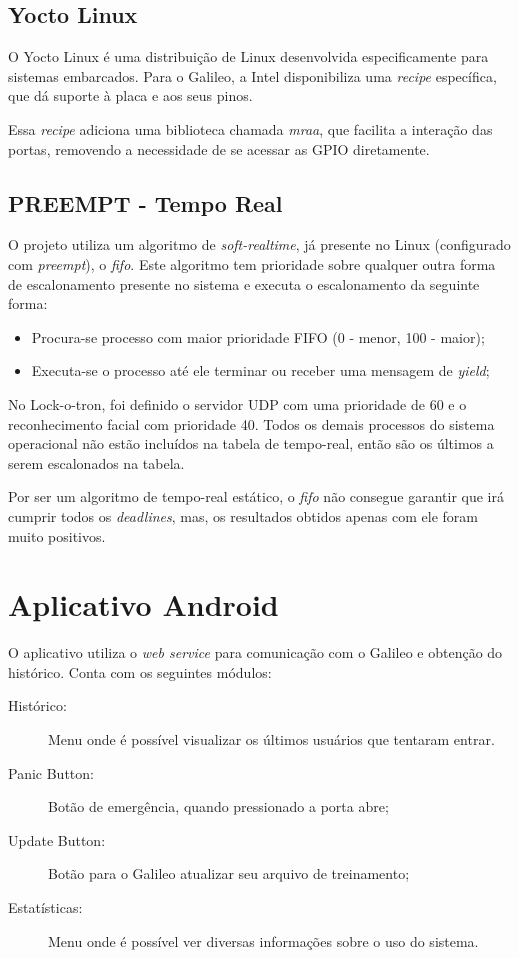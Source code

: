 \documentclass[12pt]{article}
\begin{document}
\subsection{Yocto Linux}
    O Yocto Linux é uma distribuição de Linux desenvolvida especificamente para
    sistemas embarcados. Para o Galileo, a Intel disponibiliza uma
     \textit{recipe} específica, que dá suporte à placa e aos seus pinos.

    Essa \textit{recipe} adiciona uma biblioteca chamada \textit{mraa},
    que facilita a interação das portas, removendo a necessidade de se acessar
    as GPIO diretamente.

\subsection{PREEMPT - Tempo Real}
    O projeto utiliza um algoritmo de \textit{soft-realtime}, já presente no
    Linux (configurado com \textit{preempt}), o \textit{fifo}. Este algoritmo tem
    prioridade sobre qualquer outra forma de escalonamento presente no sistema
    e executa o escalonamento da seguinte forma:
    \begin{itemize}
        \item Procura-se processo com maior prioridade FIFO (0 - menor, 100 -
        maior);
        \item Executa-se o processo até ele terminar ou receber uma mensagem de
        \textit{yield};
    \end{itemize}

    No Lock-o-tron, foi definido o servidor UDP com uma prioridade de 60 e o
    reconhecimento facial com prioridade 40. Todos os demais processos do
    sistema operacional não estão incluídos na tabela de tempo-real, então são
    os últimos a serem escalonados na tabela.

    Por ser um algoritmo de tempo-real estático, o \textit{fifo} não consegue
    garantir que irá cumprir todos os \textit{deadlines}, mas, os resultados
    obtidos apenas com ele foram muito positivos.

\section{Aplicativo Android}
    O aplicativo utiliza o \textit{web service} para comunicação com o Galileo e
    obtenção do histórico. Conta com os seguintes módulos:
    \begin{description}
        \item[Histórico:] Menu onde é possível visualizar os últimos usuários que
        tentaram entrar.
        \item[Panic Button:] Botão de emergência, quando pressionado a porta
        abre;
        \item[Update Button:] Botão para o Galileo atualizar seu arquivo de
        treinamento;
        \item[Estatísticas:] Menu onde é possível ver diversas informações sobre
        o uso do sistema.
    \end{description}
\end{document}
